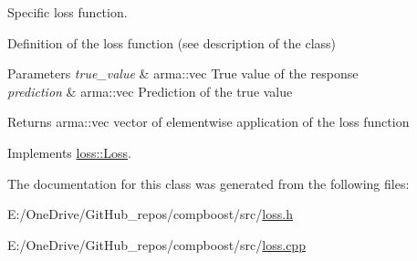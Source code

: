 Specific loss function. 

Definition of the loss function (see description of the class)


\begin{DoxyParams}{Parameters}
{\em true\+\_\+value} & {\ttfamily arma\+::vec} True value of the response \\
\hline
{\em prediction} & {\ttfamily arma\+::vec} Prediction of the true value\\
\hline
\end{DoxyParams}
\begin{DoxyReturn}{Returns}
{\ttfamily arma\+::vec} vector of elementwise application of the loss function 
\end{DoxyReturn}


Implements \mbox{\hyperlink{classloss_1_1_loss_ae9f94dd9b8311397583ba3a9cb485e94}{loss\+::\+Loss}}.



The documentation for this class was generated from the following files\+:\begin{DoxyCompactItemize}
\item 
E\+:/\+One\+Drive/\+Git\+Hub\+\_\+repos/compboost/src/\mbox{\hyperlink{loss_8h}{loss.\+h}}\item 
E\+:/\+One\+Drive/\+Git\+Hub\+\_\+repos/compboost/src/\mbox{\hyperlink{loss_8cpp}{loss.\+cpp}}\end{DoxyCompactItemize}
